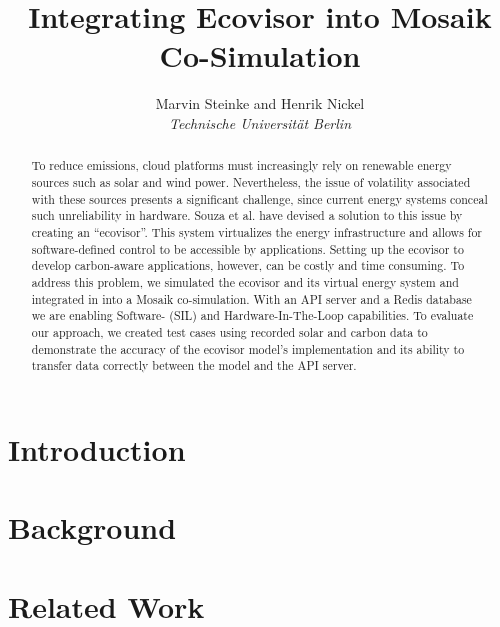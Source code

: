 \documentclass[a4paper]{IEEEtran}
\begin{document}
\title{Integrating Ecovisor into Mosaik Co-Simulation}

\author{Marvin Steinke and Henrik Nickel\\\textit{Technische Universität Berlin}}

\maketitle

\begin{abstract}

    To reduce emissions, cloud platforms must increasingly rely on renewable
    energy sources such as solar and wind power. Nevertheless, the issue of
    volatility associated with these sources presents a significant challenge,
    since current energy systems conceal such unreliability in hardware. Souza
    et al. have devised a solution to this issue by creating an
    \enquote{ecovisor}. This system virtualizes the energy infrastructure and
    allows for software-defined control to be accessible by applications.
    Setting up the ecovisor to develop carbon-aware applications, however, can
    be costly and time consuming. To address this problem, we simulated the
    ecovisor and its virtual energy system and integrated in into a Mosaik
    co-simulation. With an API server and a Redis database we are enabling
    Software- (SIL) and Hardware-In-The-Loop capabilities. To evaluate our
    approach, we created test cases using recorded solar and carbon data to
    demonstrate the accuracy of the ecovisor model's implementation and its
    ability to transfer data correctly between the model and the API server.

\end{abstract}

\section{Introduction}
\label{sec:introduction}


\section{Background}
\label{sec:background}


\section{Related Work}
\label{sec:related_work}

\end{document}
